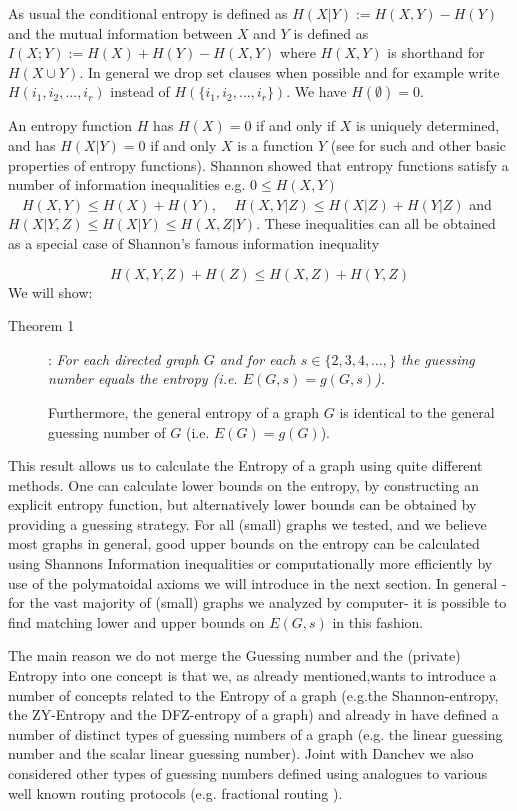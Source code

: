 \documentclass[12pt]{article}
\begin{document}
As usual the conditional entropy is defined as 
$H(X | Y):=H(X,Y)-H(Y)$ and the mutual information between $X$ and $Y$ is defined as
$I(X;Y):=H(X)+H(Y)-H(X,Y)$ 
where $H(X,Y)$ is shorthand for $H(X \cup Y)$. In general we drop set clauses when possible and for example write $H(i_1,i_2,...,i_r)$ instead of $H(\{i_1,i_2,...,i_r\})$. We have $H(\emptyset)=0$.   

An entropy  function $H$ has $H(X )=0$ if and only if  $X$ is uniquely determined, and has $H(X | Y)=0$ if and only $X$ is a function $Y$ (see \cite{YoungBook} for such and other basic properties of entropy functions). Shannon showed that entropy functions satisfy a number of information inequalities 
e.g. $0 \leq H(X,Y)$ $\quad H(X,Y) \leq H(X)+H(Y)$, $\quad H(X,Y | Z) \leq H(X | Z)+H(Y | Z)$ and
$H(X | Y,Z) \leq H(X | Y) \leq H(X,Z | Y)$. 
These inequalities can all be obtained as a special case of Shannon's famous information inequality 

\begin{equation}
H(X,Y,Z) + H(Z) \leq H(X,Z) + H(Y,Z) 
\end{equation}
We will show:

\begin{description}

\item [Theorem 1]:
\it
\noindent
For each directed  graph $G$ and for each $s \in \{2,3,4, \ldots, \}$ the guessing number equals the entropy (i.e. $E(G,s)=g(G,s)$).

Furthermore, the general entropy of a graph $G$ is identical to the general guessing number of $G$
(i.e. $E(G)=g(G)$).
\rm
\end{description}

This result allows us to calculate the Entropy of a graph using quite different methods.
One can calculate lower bounds on the entropy, by constructing an explicit entropy function, but  alternatively lower bounds can be obtained by providing a guessing strategy. For all (small) graphs we tested, and we believe most graphs in general, good upper bounds on the entropy can be calculated using Shannons Information inequalities or computationally more efficiently by use of the polymatoidal axioms we will introduce in the next section. 
In general - for the vast majority of (small) graphs we analyzed by computer- it is possible to find  matching lower and upper bounds on $E(G,s)$ in this fashion.

The main reason we do not merge the Guessing number and the (private) Entropy into one concept is that we, as already mentioned,wants to introduce a number of concepts related to the Entropy of a graph  (e.g.the Shannon-entropy, the ZY-Entropy and the DFZ-entropy of a graph) and already in 
\cite{Riis06, Riis07} have defined a number of distinct types of guessing numbers of a graph (e.g. the linear guessing number and the scalar linear guessing number). 
Joint with Danchev we also considered other types of guessing numbers defined using analogues to various well known routing protocols (e.g. fractional routing \cite{Cdfz}).
\end{document}

